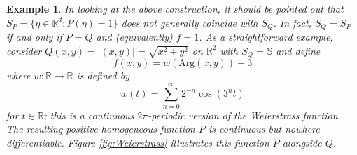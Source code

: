 \documentclass[11pt]{article}
\newtheorem{example}{Example}
\newcommand{\lp}{\left(}
\newcommand{\rp}{\right)}
\begin{document}
\begin{example}
\noindent In looking at the above construction, it should be pointed out that $S_P=\{\eta\in\mathbb{R}^d:P(\eta)=1\}$ does not generally coincide with $S_Q$. In fact, $S_Q=S_P$ if and only if $P=Q$ and (equivalently) $f=1$. As a straightforward example, consider $Q(x,y)=|(x,y)|=\sqrt{x^2+y^2}$ on $\mathbb{R}^2$ with $S_Q=\mathbb{S}$ and define
\begin{equation*}
f(x,y)=w(\mbox{Arg}(x,y))+3
\end{equation*}
where $w:\mathbb{R}\to\mathbb{R}$ is defined by
\begin{equation*}
    w(t) = \sum_{n=0}^\infty 2^{-n} \cos\lp 3^n t \rp
\end{equation*}
for $t\in\mathbb{R}$; this is a continuous $2\pi$-periodic version of the Weierstrass function. The resulting positive-homogeneous function $P$ is continuous but nowhere differentiable. Figure \ref{fig:Weierstrass} illustrates this function $P$ alongside $Q$.



\end{example}
\end{document}
